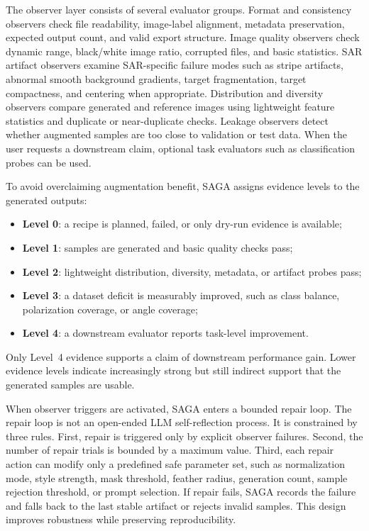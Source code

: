 The observer layer consists of several evaluator groups.
Format and consistency observers check file readability, image-label alignment, metadata preservation, expected output count, and valid export structure.
Image quality observers check dynamic range, black/white image ratio, corrupted files, and basic statistics.
SAR artifact observers examine SAR-specific failure modes such as stripe artifacts, abnormal smooth background gradients, target fragmentation, target compactness, and centering when appropriate.
Distribution and diversity observers compare generated and reference images using lightweight feature statistics and duplicate or near-duplicate checks.
Leakage observers detect whether augmented samples are too close to validation or test data.
When the user requests a downstream claim, optional task evaluators such as classification probes can be used.

To avoid overclaiming augmentation benefit, SAGA assigns evidence levels to the generated outputs:
\begin{itemize}
    \item \textbf{Level 0}: a recipe is planned, failed, or only dry-run evidence is available;
    \item \textbf{Level 1}: samples are generated and basic quality checks pass;
    \item \textbf{Level 2}: lightweight distribution, diversity, metadata, or artifact probes pass;
    \item \textbf{Level 3}: a dataset deficit is measurably improved, such as class balance, polarization coverage, or angle coverage;
    \item \textbf{Level 4}: a downstream evaluator reports task-level improvement.
\end{itemize}
Only Level~4 evidence supports a claim of downstream performance gain.
Lower evidence levels indicate increasingly strong but still indirect support that the generated samples are usable.

When observer triggers are activated, SAGA enters a bounded repair loop.
The repair loop is not an open-ended LLM self-reflection process.
It is constrained by three rules.
First, repair is triggered only by explicit observer failures.
Second, the number of repair trials is bounded by a maximum value.
Third, each repair action can modify only a predefined safe parameter set, such as normalization mode, style strength, mask threshold, feather radius, generation count, sample rejection threshold, or prompt selection.
If repair fails, SAGA records the failure and falls back to the last stable artifact or rejects invalid samples.
This design improves robustness while preserving reproducibility.

